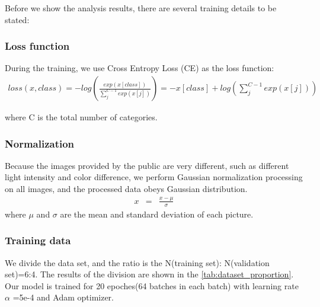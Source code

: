 \documentclass{mcmthesis}
\begin{document}
Before we show the analysis results, there are several training details to be stated:
\subsubsection{Loss function}
During the training, we use Cross Entropy Loss (CE) as the loss function:
\begin{eqnarray}
loss(x,class)=- log(\frac{exp(x[class])}{\sum_j^{C-1}exp(x[j])}) = - x[class]+log( \sum_j^{C-1}exp(x[j]))
\end{eqnarray}

where C is the total number of categories.

\subsubsection{Normalization}
Because the images provided by the public are very different, such as different light intensity and color difference, we perform Gaussian normalization processing on all images, and the processed data obeys Gaussian distribution.
\begin{eqnarray}
x & = & \frac{x-\mu }{\sigma }
\end{eqnarray}
where $\mu$ and $\sigma$ are the mean and standard deviation of each picture.

\subsubsection{Training data}
We divide the data set, and the ratio is the N(training set): N(validation set)=6:4. The results of the division are shown in the \autoref{tab:dataset_proportion}. Our model is trained for 20 epoches(64 batches in each batch) with learning rate $\alpha$ =5e-4 and Adam optimizer.
\end{document}
